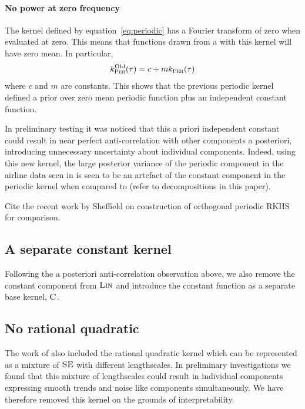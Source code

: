 \documentclass{article}
\begin{document}
\paragraph{No power at zero frequency}

The kernel defined by equation~\eqref{eq:periodic} has a Fourier transform of zero when evaluated at zero.
This means that functions drawn from a \gp{} with this kernel will have zero mean.
In particular,
\begin{equation}
k^\textrm{Old}_{\textsc{Per}}(\tau) = c + mk_{\textsc{Per}}(\tau)
\end{equation}
where $c$ and $m$ are constants.
This shows that the previous periodic kernel defined a prior over zero mean periodic function plus an independent constant function.

In preliminary testing it was noticed that this a priori independent constant could result in near perfect anti-correlation with other components a posteriori, introducing unnecessary uncertainty about individual components.
Indeed, using this new kernel, the large posterior variance of the periodic component in the airline data seen in \cite{DuvLloGroetal13} is seen to be an artefact of the constant component in the periodic kernel when compared to (refer to decompositions in this paper).

Cite the recent work by Sheffield on construction of orthogonal periodic RKHS for comparison.

\subsection{A separate constant kernel}

Following the a posteriori anti-correlation observation above, we also remove the constant component from ${\textsc{Lin}}$ and introduce the constant function as a separate base kernel, ${\textsc{C}}$.

\subsection{No rational quadratic}

The work of \cite{DuvLloGroetal13} also included the rational quadratic kernel which can be represented as a mixture of ${\textsc{SE}}$ with different lengthscales.
In preliminary investigations we found that this mixture of lengthscales could result in individual components expressing smooth trends and noise like components simultaneously.
We have therefore removed this kernel on the grounds of interpretability.
\end{document}
